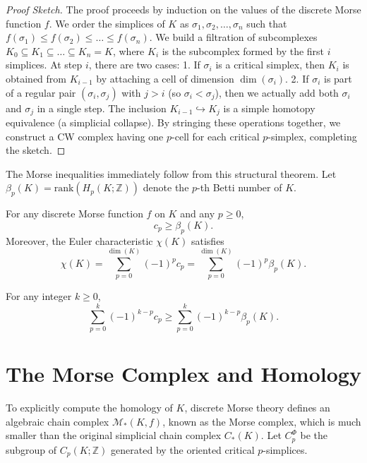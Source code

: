 \begin{proof}[Proof Sketch]
The proof proceeds by induction on the values of the discrete Morse function $f$. We order the simplices of $K$ as $\sigma_1, \sigma_2, \dots, \sigma_n$ such that $f(\sigma_1) \le f(\sigma_2) \le \dots \le f(\sigma_n)$. We build a filtration of subcomplexes $K_0 \subseteq K_1 \subseteq \dots \subseteq K_n = K$, where $K_i$ is the subcomplex formed by the first $i$ simplices.
At step $i$, there are two cases:
1. If $\sigma_i$ is a critical simplex, then $K_i$ is obtained from $K_{i-1}$ by attaching a cell of dimension $\dim(\sigma_i)$.
2. If $\sigma_i$ is part of a regular pair $(\sigma_i, \sigma_j)$ with $j > i$ (so $\sigma_i < \sigma_j$), then we actually add both $\sigma_i$ and $\sigma_j$ in a single step. The inclusion $K_{i-1} \hookrightarrow K_j$ is a simple homotopy equivalence (a simplicial collapse).
By stringing these operations together, we construct a CW complex having one $p$-cell for each critical $p$-simplex, completing the sketch.
\end{proof}

The Morse inequalities immediately follow from this structural theorem. Let $\beta_p(K) = \mathrm{rank}(H_p(K; \mathbb{Z}))$ denote the $p$-th Betti number of $K$.

\begin{theorem}
\label{thm:weak_morse}
For any discrete Morse function $f$ on $K$ and any $p \ge 0$,
\[ c_p \ge \beta_p(K). \]
Moreover, the Euler characteristic $\chi(K)$ satisfies
\[ \chi(K) = \sum_{p=0}^{\dim(K)} (-1)^p c_p = \sum_{p=0}^{\dim(K)} (-1)^p \beta_p(K). \]
\end{theorem}

\begin{theorem}
\label{thm:strong_morse}
For any integer $k \ge 0$,
\[ \sum_{p=0}^k (-1)^{k-p} c_p \ge \sum_{p=0}^k (-1)^{k-p} \beta_p(K). \]
\end{theorem}

\section{The Morse Complex and Homology}

To explicitly compute the homology of $K$, discrete Morse theory defines an algebraic chain complex $\mathcal{M}_*(K, f)$, known as the Morse complex, which is much smaller than the original simplicial chain complex $C_*(K)$. Let $C_p^\Phi$ be the subgroup of $C_p(K; \mathbb{Z})$ generated by the oriented critical $p$-simplices.

